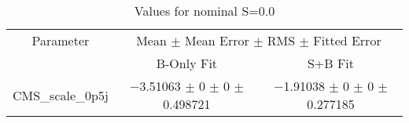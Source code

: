 \begin{table}
\centering
\caption{Values for nominal S=0.0}
\begin{tabular}{ccc}
\toprule
Parameter & \multicolumn{2}{c}{Mean $\pm$ Mean Error $\pm$ RMS $\pm$ Fitted Error}\\
 & B-Only Fit & S+B Fit\\
\midrule
CMS\_scale\_0p5j & \num{-3.51063} $\pm$ \num{0} $\pm$ \num{0} $\pm$ \num{0.498721} & \num{-1.91038} $\pm$ \num{0} $\pm$ \num{0} $\pm$ \num{0.277185}\\
\bottomrule
\end{tabular}
\end{table}